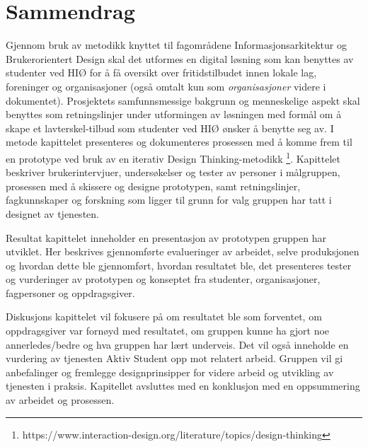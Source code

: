\cleardoublepage

 \setcounter{page}{1}
\chapter*{Sammendrag}
Gjennom bruk av metodikk knyttet til fagområdene Informasjonsarkitektur og Brukerorientert Design skal det utformes en digital løsning som kan benyttes av studenter ved HIØ for å få oversikt over fritidstilbudet innen lokale lag, foreninger og organisasjoner (også omtalt kun som {\em organisasjoner} videre i dokumentet). Prosjektets samfunnsmessige bakgrunn og menneskelige aspekt skal benyttes som retningslinjer under utformingen av løsningen med formål om å skape et lavterskel-tilbud som studenter ved HIØ ønsker å benytte seg av.
I metode kapittelet presenteres og dokumenteres prosessen med å komme frem til en prototype ved bruk av en iterativ Design Thinking-metodikk \footnote{https://www.interaction-design.org/literature/topics/design-thinking}. Kapittelet beskriver brukerintervjuer, undersøkelser og tester av personer i målgruppen, prosessen med å skissere og designe prototypen, samt retningslinjer, fagkunnskaper og forskning som ligger til grunn for valg gruppen har tatt i designet av tjenesten.

Resultat kapittelet inneholder en presentasjon av prototypen gruppen har utviklet. Her beskrives gjennomførte evalueringer av arbeidet, selve produksjonen og hvordan dette ble gjennomført, hvordan resultatet ble,  det presenteres tester og vurderinger av prototypen og konseptet fra studenter, organisasjoner, fagpersoner og oppdragsgiver.

Diskusjons kapittelet vil fokusere på om resultatet ble som forventet, om oppdragsgiver var fornøyd med resultatet, om gruppen kunne ha gjort noe annerledes/bedre og hva gruppen har lært underveis. Det vil også inneholde en vurdering av tjenesten Aktiv Student opp mot relatert arbeid. Gruppen vil gi anbefalinger og fremlegge designprinsipper for videre arbeid og utvikling av tjenesten i praksis. Kapitellet avsluttes med en konklusjon med en oppsummering av arbeidet og prosessen.